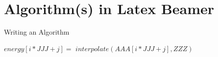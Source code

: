 \documentclass[12pt, aspectration=54]{beamer}
\begin{document}
\section{Algorithm(s) in Latex Beamer}
\begin{frame}{Writing an Algorithm}
\begin{algorithm}[H]
\begin{algorithmic}[1]
\STATE $energy[i*JJJ+j] =$ 
$ interpolate(AAA[i*JJJ+j], ZZZ)$
\ENDFOR
\ENDFOR
\end{algorithmic}
\caption{pseudocode for the calculation of }
\label{alg:seq}
\end{algorithm}
\end{frame}
\end{document}
